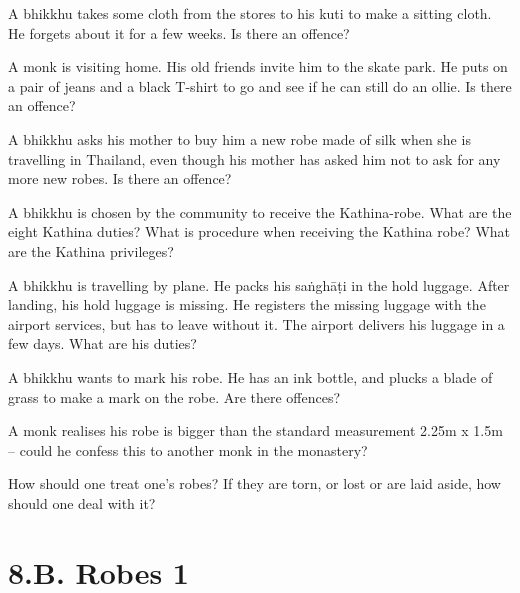 \bigskip

A bhikkhu takes some cloth from the stores to his kuti to make a sitting cloth. He
forgets about it for a few weeks. Is there an offence?

\bigskip

A monk is visiting home. His old friends invite him to the skate park. He puts
on a pair of jeans and a black T-shirt to go and see if he can still do an
ollie. Is there an offence?

\bigskip

A bhikkhu asks his mother to buy him a new robe made of silk when she is travelling in Thailand,
even though his mother has asked him not to ask for any more new robes. Is there an offence?

\bigskip

A bhikkhu is chosen by the community to receive the Kathina-robe. What are the
eight Kathina duties? What is procedure when receiving the Kathina robe? What
are the Kathina privileges?

\bigskip

A bhikkhu is travelling by plane. He packs his saṅghāṭi in the hold luggage. After
landing, his hold luggage is missing. He registers the missing luggage with the
airport services, but has to leave without it. The airport delivers his luggage
in a few days. What are his duties?

\bigskip

A bhikkhu wants to mark his robe. He has an ink bottle, and plucks a blade of
grass to make a mark on the robe. Are there offences?

\bigskip

A monk realises his robe is bigger than the standard measurement 2.25m x 1.5m –
could he confess this to another monk in the monastery?

\bigskip

How should one treat one's robes? If they are torn, or lost or are laid aside, how should one deal with it?

\chapter{8.B. Robes 1}
\renewcommand*{\theChapterTitle}{8.B. Robes 1}
